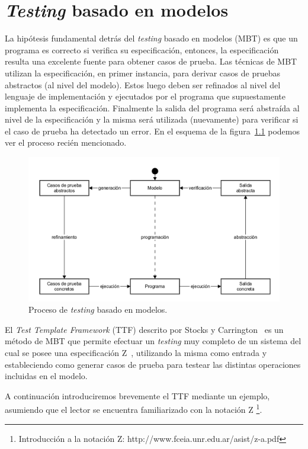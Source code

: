 \chapter{\textit{Testing} basado en modelos}

La hipótesis fundamental detrás del \textit{testing} basado en modelos (MBT) es que un programa es correcto si verifica su especificación, entonces, la especificación resulta una excelente fuente para obtener casos de prueba. Las técnicas de MBT utilizan la especificación, en primer instancia, para derivar casos de pruebas abstractos (al nivel del modelo). Estos luego deben ser refinados al nivel del lenguaje de implementación y ejecutados por el programa que supuestamente implementa la especificación. Finalmente la salida del programa será abstraída al nivel de la especificación y la misma será utilizada (nuevamente) para verificar si el caso de prueba ha detectado un error. En el esquema de la figura~\ref{fig:proc_mbt} podemos ver el proceso recién mencionado.

\begin{figure}[H]
\begin{center}
\includegraphics[scale=0.25]{img/proc_mbt.png}
\caption{Proceso de \textit{testing} basado en modelos.}
\label{fig:proc_mbt}
\end{center}
\end{figure}


El \textit{Test Template Framework} (TTF) descrito por Stocks y Carrington~\cite{stocks} es un método de MBT que permite efectuar un \textit{testing} muy completo de un sistema del cual se posee una especificación Z~\cite{spivey}, utilizando la misma como entrada y estableciendo como generar casos de prueba para testear las distintas operaciones incluidas en el modelo.

A continuación introduciremos brevemente el TTF mediante un ejemplo, asumiendo que el lector se encuentra familiarizado con la notación Z \footnote{Introducción a la notación Z: http://www.fceia.unr.edu.ar/asist/z-a.pdf}.

